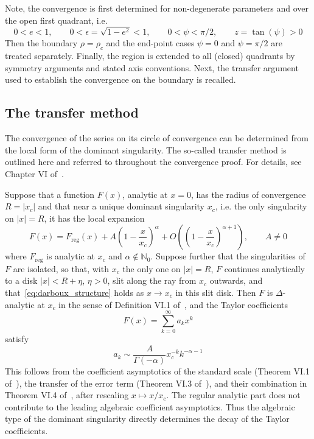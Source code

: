 \documentclass[a4paper]{amsart}
\begin{document}
Note, the convergence is first determined for non-degenerate parameters and over the open first quadrant, i.e.
\begin{equation*}
0<e<1,\qquad 0<\epsilon=\sqrt{1-e^2}<1,\qquad 0<\psi<\pi/2,\qquad z=\tan(\psi)>0
\end{equation*}
Then the boundary $\rho=\rho_c$ and the end-point cases $\psi=0$ and $\psi=\pi/2$ are treated separately. Finally, the region is extended to all (closed) quadrants by symmetry arguments and stated axis conventions. Next, the transfer argument used to establish the convergence on the boundary is recalled.


\subsection{The transfer method}\label{sec:transfer}
The convergence of the series on its circle of convergence can be determined from the local form of the dominant singularity. The so-called transfer method is outlined here and referred to throughout the convergence proof. For details, see Chapter VI of~\cite{Flajolet2009}.

Suppose that a function $F(x)$, analytic at $x=0$, has the radius of convergence $R=|x_c|$ and that near a unique dominant singularity $x_c$, i.e. the only singularity on $|x|=R$, it has the local expansion
\begin{equation}\label{eq:darboux_structure}
F(x)
=
F_{\mathrm{reg}}(x)
+
A\left(1-\frac{x}{x_c}\right)^{\alpha}
+
O\left(\left(1-\frac{x}{x_c}\right)^{\alpha+1}\right),
\qquad
A\neq0
\end{equation}
where $F_{\mathrm{reg}}$ is analytic at $x_c$ and $\alpha\notin\mathbb{N}_0$. Suppose further that the singularities of $F$ are isolated, so that, with $x_c$ the only one on $|x|=R$, $F$ continues analytically to a disk $|x|<R+\eta$, $\eta>0$, slit along the ray from $x_c$ outwards, and that~\eqref{eq:darboux_structure} holds as $x\to x_c$ in this slit disk. Then $F$ is $\Delta$-analytic at $x_c$ in the sense of Definition VI.1 of~\cite{Flajolet2009}, and the Taylor coefficients
\begin{equation*}
F(x)=\sum_{k=0}^{\infty}a_kx^k
\end{equation*}
satisfy
\begin{equation}\label{eq:darboux_transfer}
a_k
\sim
\frac{A}{\Gamma(-\alpha)}
x_c^{-k}k^{-\alpha-1}
\end{equation}
This follows from the coefficient asymptotics of the standard scale (Theorem VI.1 of~\cite{Flajolet2009}), the transfer of the error term (Theorem VI.3 of~\cite{Flajolet2009}), and their combination in Theorem VI.4 of~\cite{Flajolet2009}, after rescaling $x\mapsto x/x_c$.
%
The regular analytic part does not contribute to the leading algebraic coefficient asymptotics.
%
Thus the algebraic type of the dominant singularity directly determines the decay of the Taylor coefficients.
\end{document}
